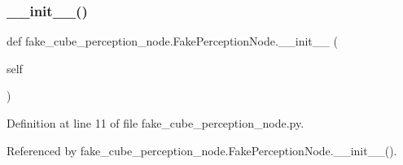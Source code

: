 \subsubsection{\texorpdfstring{\+\_\+\+\_\+init\+\_\+\+\_\+()}{\_\_init\_\_()}\hspace{0.1cm}{\footnotesize\ttfamily [1/3]}}
{\footnotesize\ttfamily def fake\+\_\+cube\+\_\+perception\+\_\+node.\+Fake\+Perception\+Node.\+\_\+\+\_\+init\+\_\+\+\_\+ (\begin{DoxyParamCaption}\item[{}]{self }\end{DoxyParamCaption})}



Definition at line 11 of file fake\+\_\+cube\+\_\+perception\+\_\+node.\+py.



Referenced by fake\+\_\+cube\+\_\+perception\+\_\+node.\+Fake\+Perception\+Node.\+\_\+\+\_\+init\+\_\+\+\_\+().


